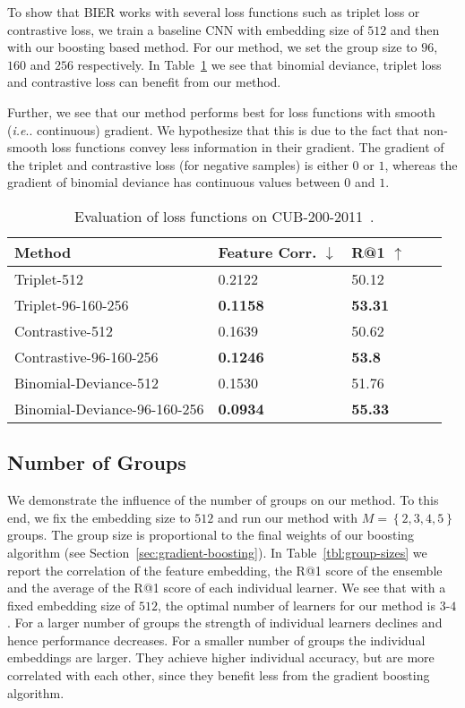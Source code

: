 \documentclass[10pt,journal,compsoc]{IEEEtran}
\makeatletter
\DeclareRobustCommand\onedot{\futurelet\@let@token\@onedot}
\def\@onedot{\ifx\@let@token.\else.\null\fi\xspace}
\def\ie{\emph{i.e}\onedot} \def\Ie{\emph{I.e}\onedot}
\makeatother
\begin{document}
To show that \ac{BIER} works with several loss functions such as triplet loss or contrastive loss,
we train a baseline \ac{CNN} with embedding size of $512$ and then with our boosting based method. 
For our method, we set the group size to $96$, $160$ and $256$ respectively. In Table~\ref{tbl:loss-functions} we see that 
binomial deviance, triplet loss and contrastive loss can benefit from our method.

Further, we see that our method performs best for loss functions with smooth
(\ie continuous) gradient. We hypothesize that this is due to the fact that
non-smooth loss functions convey less information in their gradient. The
gradient of the triplet and contrastive loss (for negative samples) is either $0$
or $1$, whereas the gradient of binomial deviance has continuous values
between $0$ and $1$.  

\begin{table}[htbp]
\caption{Evaluation of loss functions on CUB-200-2011~\cite{WahCUB_200_2011}. }
\label{tbl:loss-functions}

\renewcommand{\arraystretch}{1.3}
\centering
\begin{tabular}{lllll}
\hline
Method                         & Feature Corr. $\downarrow$    & R@1 $\uparrow$  \\
\hline
Triplet-512                    & 0.2122          & 50.12 \\
Triplet-96-160-256             & \textbf{0.1158}  & \textbf{53.31}  \\
\hline
Contrastive-512                & 0.1639          & 50.62            \\
Contrastive-96-160-256         & \textbf{0.1246}  & \textbf{53.8}   \\
\hline
Binomial-Deviance-512        &  0.1530            & 51.76  \\
Binomial-Deviance-96-160-256 & \textbf{0.0934}  & \textbf{55.33}  \\
\hline
\end{tabular}
\end{table}\subsection{Number of Groups}\label{sec:eval-number-of-groups}

We demonstrate the influence of the number of groups on our method. To this end,
we fix the embedding size to $512$ and 
run our method with $M = \left\{2, 3, 4, 5\right\}$ groups. The
group size is proportional to the final weights of our boosting
algorithm (see Section~\ref{sec:gradient-boosting}). In Table~\ref{tbl:group-sizes}
we report the correlation of the feature embedding, the R@1 score of the ensemble and the average
of the R@1 score of each individual learner.
We see that with a fixed embedding size of $512$, the optimal number of
learners for our method is $3$-$4$. For a larger number of groups the strength of individual learners 
declines and hence performance decreases. For a smaller number of groups
the individual embeddings are larger. They achieve higher individual accuracy, but are more correlated
with each other, since they benefit less from the gradient
boosting algorithm.
\end{document}
